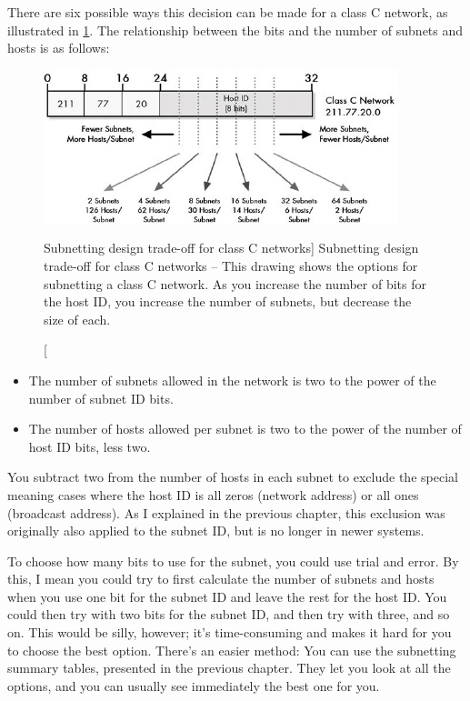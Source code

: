 There are six possible ways this decision can be made for a class C network, as illustrated in \cref{fig:subnetting-design-trade-off}.
The relationship between the bits and the number of subnets and hosts is as follows:


\begin{figure}
   \centering
   \includegraphics[width=.7\textwidth]{images/subnetting-design-trade-off.jpg}
   \caption
      [Subnetting design trade-off for class C networks]
      {Subnetting design trade-off for class C networks -- This drawing shows the options for subnetting a class C network.
      As you increase the number of bits for the host ID, you increase the number of subnets, but decrease the size of each.}
   \label{fig:subnetting-design-trade-off}
\end{figure}


\begin{itemize}
   \item
      The number of subnets allowed in the network is two to the power of the number of subnet ID bits.
   \item
      The number of hosts allowed per subnet is two to the power of the number of host ID bits, less two.
\end{itemize}

You subtract two from the number of hosts in each subnet to exclude the
special meaning cases where the host ID is all zeros (network address) or all ones (broadcast address).
As I explained in the previous chapter, this exclusion was originally also applied to the subnet ID, but is no longer in newer systems.

To choose how many bits to use for the subnet, you could use trial and error.
By this, I mean you could try to first calculate the number of subnets and hosts when you use one bit for the subnet ID and leave the rest for the host ID.
You could then try with two bits for the subnet ID, and then try with three, and so on.
This would be silly, however; it's time-consuming and makes it hard for you to choose the best option.
There's an easier method: You can use the subnetting summary tables, presented in the previous chapter.
They let you look at all the options, and you can usually see immediately the best one for you.

